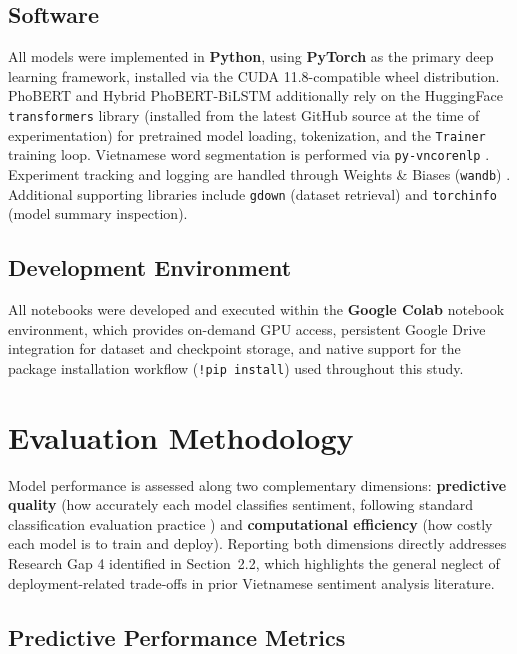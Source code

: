 \documentclass[12pt]{report} %
\begin{document}
\subsection{Software}
All models were implemented in \textbf{Python}, using \textbf{PyTorch} \cite{paszke2019pytorch} as the primary deep learning framework, installed via the CUDA 11.8-compatible wheel distribution. PhoBERT and Hybrid PhoBERT-BiLSTM additionally rely on the HuggingFace \texttt{transformers} library \cite{wolf2020transformers} (installed from the latest GitHub source at the time of experimentation) for pretrained model loading, tokenization, and the \texttt{Trainer} training loop. Vietnamese word segmentation is performed via \texttt{py-vncorenlp} \cite{vu2018vncorenlp}. Experiment tracking and logging are handled through Weights \& Biases (\texttt{wandb}) \cite{wandb}. Additional supporting libraries include \texttt{gdown} (dataset retrieval) and \texttt{torchinfo} (model summary inspection).

\subsection{Development Environment}
All notebooks were developed and executed within the \textbf{Google Colab} notebook environment, which provides on-demand GPU access, persistent Google Drive integration for dataset and checkpoint storage, and native support for the package installation workflow (\texttt{!pip install}) used throughout this study.

\section{Evaluation Methodology}

Model performance is assessed along two complementary dimensions: \textbf{predictive quality} (how accurately each model classifies sentiment, following standard classification evaluation practice \cite{sokolova2009systematic}) and \textbf{computational efficiency} (how costly each model is to train and deploy). Reporting both dimensions directly addresses Research Gap 4 identified in Section~2.2, which highlights the general neglect of deployment-related trade-offs in prior Vietnamese sentiment analysis literature.

\subsection{Predictive Performance Metrics}
\end{document}
